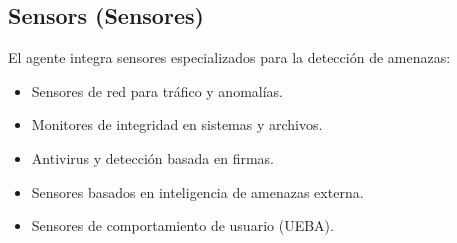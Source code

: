 \subsection{Sensors (Sensores)}
El agente integra sensores especializados para la detección de amenazas:
\begin{itemize}
    \item Sensores de red para tráfico y anomalías.
    \item Monitores de integridad en sistemas y archivos.
    \item Antivirus y detección basada en firmas.
    \item Sensores basados en inteligencia de amenazas externa.
    \item Sensores de comportamiento de usuario (UEBA).
\end{itemize}